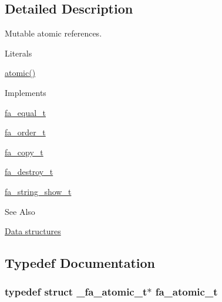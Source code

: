 \subsection{Detailed Description}
Mutable atomic references. \begin{DoxyParagraph}{Literals}

\begin{DoxyItemize}
\item {\ttfamily \hyperlink{util_8h_a5181e62dd55d17e3c1fd4ad40865f737}{atomic()}}
\end{DoxyItemize}
\end{DoxyParagraph}
\begin{DoxyParagraph}{Implements}

\begin{DoxyItemize}
\item \hyperlink{structfa__equal__t}{fa\-\_\-equal\-\_\-t}
\item \hyperlink{structfa__order__t}{fa\-\_\-order\-\_\-t}
\item \hyperlink{structfa__copy__t}{fa\-\_\-copy\-\_\-t}
\item \hyperlink{structfa__destroy__t}{fa\-\_\-destroy\-\_\-t}
\item \hyperlink{structfa__string__show__t}{fa\-\_\-string\-\_\-show\-\_\-t}
\end{DoxyItemize}
\end{DoxyParagraph}
\begin{DoxySeeAlso}{See Also}

\begin{DoxyItemize}
\item \hyperlink{md__data_structures_DataStructures}{Data structures} 
\end{DoxyItemize}
\end{DoxySeeAlso}


\subsection{Typedef Documentation}
\hypertarget{group___fa_atomic_gaa3c9a8cdc36169052d96fa152e2eb9ae}{
\subsubsection[{fa\-\_\-atomic\-\_\-t}]{\setlength{\rightskip}{0pt plus 5cm}typedef struct \-\_\-fa\-\_\-atomic\-\_\-t$\ast$ {\bf fa\-\_\-atomic\-\_\-t}}}\label{group___fa_atomic_gaa3c9a8cdc36169052d96fa152e2eb9ae}


